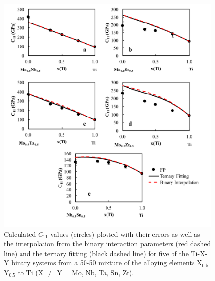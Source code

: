 \pagebreak
\begin{figure}[H]
	\centering
	\includegraphics[width=\textwidth]{Chapter-6/Figures/tixyc111.png}
	\caption{Calculated $\overline{C}_{11}$ values (circles) plotted with their errors as well as the interpolation from the binary interaction parameters (red dashed line) and the ternary fitting (black dashed line) for five of the Ti-X-Y binary systems from a 50-50 mixture of the alloying elements X$_{0.5}$Y$_{0.5}$ to Ti (X $\neq$ Y = Mo, Nb, Ta, Sn, Zr).}
	\label{Ch6-figure:tixyc11_1}
\end{figure}

